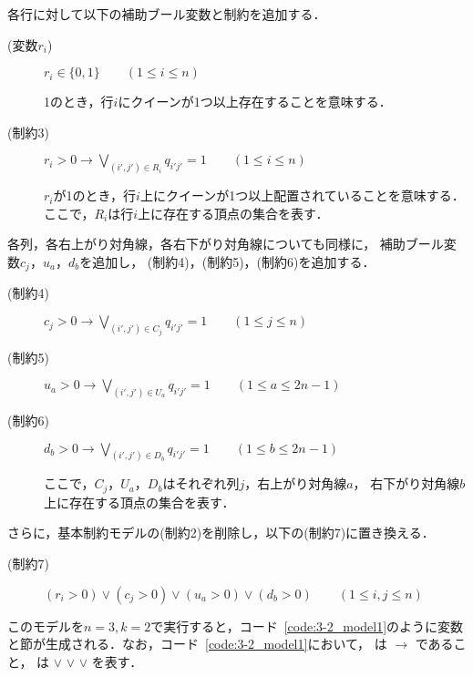 各行に対して以下の補助ブール変数と制約を追加する．
\begin{description}
 \item[(変数$r_i$)] $r_{i} \in \{0,1\} \qquad (1 \leq i \leq n)$\par
  1のとき，行$i$にクイーンが1つ以上存在することを意味する．
 \item[(制約3)] $r_{i}>0 \rightarrow \bigvee\limits_{(i',j')\in R_{i}} q_{i'j'}=1 \qquad (1 \leq i \leq n)$ \par
  $r_{i}$が1のとき，行$i$上にクイーンが1つ以上配置されていることを意味する．
  ここで，$R_i$は行$i$上に存在する頂点の集合を表す．
\end{description}
%
各列，各右上がり対角線，各右下がり対角線についても同様に，
補助ブール変数$c_{j}$，$u_{a}$，$d_{b}$を追加し，
(制約4)，(制約5)，(制約6)を追加する．
%
\begin{description}
 \item[(制約4)] $c_{j}>0 \rightarrow \bigvee\limits_{(i',j')\in C_{j}} q_{i'j'}=1 \qquad (1 \leq j \leq n)$ 
 \item[(制約5)] $u_{a}>0 \rightarrow \bigvee\limits_{(i',j')\in U_{a}} q_{i'j'}=1 \qquad (1 \leq a \leq 2n-1)$ 
 \item[(制約6)] $d_{b}>0 \rightarrow \bigvee\limits_{(i',j')\in D_{b}} q_{i'j'}=1 \qquad (1 \leq b \leq 2n-1)$ \par
  ここで，$C_j$，$U_{a}$，$D_{b}$はそれぞれ列$j$，右上がり対角線$a$，
  右下がり対角線$b$上に存在する頂点の集合を表す．
\end{description}

さらに，基本制約モデルの(制約2)を削除し，以下の(制約7)に置き換える．
\begin{description}
 \item[(制約7)] $(r_i > 0) \vee (c_j >0) \vee (u_{a}>0) \vee (d_{b}>0) \qquad (1 \leq i,j \leq n)$
\end{description}

このモデルを$n=3,k=2$で実行すると，コード~\ref{code:3-2_model1}のように変数と節が生成される．なお，コード~\ref{code:3-2_model1}において，  は $\rightarrow$    であること，   は $\vee$  $\vee$  $\vee$ を表す．



